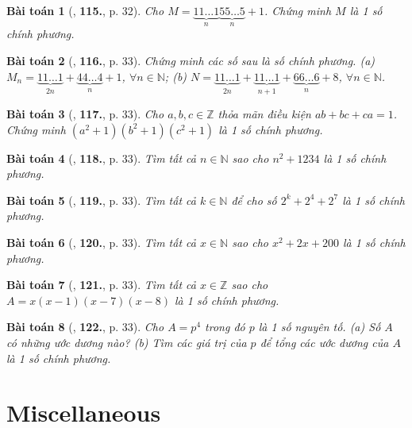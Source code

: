 \documentclass{article}
\numberwithin{equation}{section}
\newtheorem{baitoan}{Bài toán}
\begin{document}
\begin{baitoan}[\cite{Tuyen_Toan_8}, \textbf{115.}, p. 32]
	Cho $M = \underbrace{11\ldots1}_n\underbrace{55\ldots5}_n + 1$. Chứng minh $M$ là 1 số chính phương.
\end{baitoan}

\begin{baitoan}[\cite{Tuyen_Toan_8}, \textbf{116.}, p. 33]
	Chứng minh các số sau là số chính phương. (a) $M_n = \underbrace{11\ldots1}_{2n} + \underbrace{44\ldots4}_n + 1$, $\forall n\in\mathbb{N}$; (b) $N = \underbrace{11\ldots1}_{2n} + \underbrace{11\ldots1}_{n+1} + \underbrace{66\ldots6}_n + 8$, $\forall n\in\mathbb{N}$.
\end{baitoan}

\begin{baitoan}[\cite{Tuyen_Toan_8}, \textbf{117.}, p. 33]
	Cho $a,b,c\in\mathbb{Z}$ thỏa mãn điều kiện $ab + bc + ca = 1$. Chứng minh $(a^2 + 1)(b^2 + 1)(c^2 + 1)$ là 1 số chính phương.
\end{baitoan}

\begin{baitoan}[\cite{Tuyen_Toan_8}, \textbf{118.}, p. 33]
	Tìm tất cả $n\in\mathbb{N}$ sao cho $n^2 + 1234$ là 1 số chính phương.
\end{baitoan}

\begin{baitoan}[\cite{Tuyen_Toan_8}, \textbf{119.}, p. 33]
	Tìm tất cả $k\in\mathbb{N}$ để cho số $2^k + 2^4 + 2^7$ là 1 số chính phương.
\end{baitoan}

\begin{baitoan}[\cite{Tuyen_Toan_8}, \textbf{120.}, p. 33]
	Tìm tất cả $x\in\mathbb{N}$ sao cho $x^2 + 2x + 200$ là 1 số chính phương.
\end{baitoan}

\begin{baitoan}[\cite{Tuyen_Toan_8}, \textbf{121.}, p. 33]
	Tìm tất cả $x\in\mathbb{Z}$ sao cho $A = x(x - 1)(x - 7)(x - 8)$ là 1 số chính phương.
\end{baitoan}

\begin{baitoan}[\cite{Tuyen_Toan_8}, \textbf{122.}, p. 33]
	Cho $A = p^4$ trong đó $p$ là 1 số nguyên tố. (a) Số $A$ có những ước dương nào? (b) Tìm các giá trị của $p$ để tổng các ước dương của $A$ là 1 số chính phương.
\end{baitoan}


\section{Miscellaneous}


\printbibliography[heading=bibintoc]
	
\end{document}
